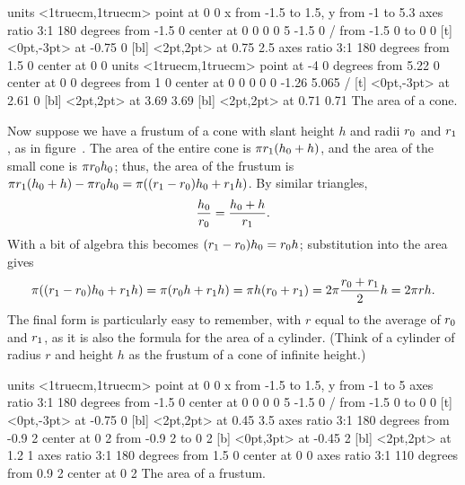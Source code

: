 \figure
\texonly
\vbox{\beginpicture
\normalgraphs
\sevenpoint
\setcoordinatesystem units <1truecm,1truecm> point at 0 0
\setplotarea x from -1.5 to 1.5, y from -1 to 5.3
\ellipticalarc  axes ratio 3:1  180 degrees from -1.5 0 center at 0 0
 0 0 5 -1.5 0 /
\putrule from -1.5 0 to 0 0
 [t] <0pt,-3pt> at -0.75 0
 [bl] <2pt,2pt> at 0.75 2.5 
\setdashes
\ellipticalarc  axes ratio 3:1  180 degrees from 1.5 0 center at 0 0
\setsolid
\setcoordinatesystem units <1truecm,1truecm> point at -4 0
 degrees from 5.22 0 center at 0 0
 degrees from 1 0 center at 0 0
 0 0 0 -1.26 5.065 /
 [t] <0pt,-3pt> at 2.61 0
 [bl] <2pt,2pt> at 3.69 3.69  
 [bl] <2pt,2pt> at 0.71 0.71
\endpicture}
\endtexonly
{}
\begincaption
The area of a cone.
\endcaption
\endfigure

Now suppose we have a frustum of a cone with slant height $h$ and
radii $\displaystyle r_0$ and $\displaystyle r_1$, as in figure~. The area of
the entire cone is $\displaystyle \pi r_1(h_0+h)$, and the area of the small cone is
$\displaystyle \pi r_0 h_0$; thus, the area of the frustum is $\displaystyle \pi r_1(h_0+h)-\pi
r_0 h_0=\pi((r_1-r_0)h_0+r_1h)$. By similar triangles, 
$${h_0\over r_0}={h_0+h\over r_1}.$$
With a bit of algebra this becomes $\displaystyle (r_1-r_0)h_0= r_0h$; substitution
into the area gives
$$
  \pi((r_1-r_0)h_0+r_1h)=\pi(r_0h+r_1h)=\pi h(r_0+r_1)=2\pi
  {r_0+r_1\over2} h = 2\pi r h.
$$
The final form is particularly easy to remember, with $r$ equal to the
average of $\displaystyle r_0$ and $\displaystyle r_1$, as it is also the formula for the area of
a cylinder. (Think of a cylinder of radius $r$ and height $h$ as the
frustum of a cone of infinite height.)

\figure
\texonly
\vbox{\beginpicture
\normalgraphs
\sevenpoint
\setcoordinatesystem units <1truecm,1truecm> point at 0 0
\setplotarea x from -1.5 to 1.5, y from -1 to 5
\ellipticalarc  axes ratio 3:1  180 degrees from -1.5 0 center at 0 0
 0 0 5 -1.5 0 /
\putrule from -1.5 0 to 0 0
 [t] <0pt,-3pt> at -0.75 0
 [bl] <2pt,2pt> at 0.45 3.5 
\ellipticalarc  axes ratio 3:1  180 degrees from -0.9 2 center at 0 2
\putrule from -0.9 2 to 0 2
 [b] <0pt,3pt> at -0.45 2
 [bl] <2pt,2pt> at 1.2 1
\setdashes
\ellipticalarc  axes ratio 3:1  180 degrees from 1.5 0 center at 0 0
\ellipticalarc  axes ratio 3:1  110 degrees from 0.9 2 center at 0 2
\endpicture}
\endtexonly
{}
\begincaption
The area of a frustum.
\endcaption
\endfigure

